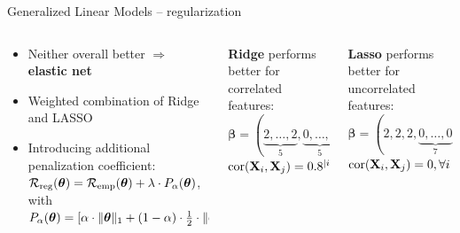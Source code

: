 \documentclass[11pt,compress,t,notes=noshow, xcolor=table]{beamer}
\begin{document}
\begin{frame2}{Generalized Linear Models -- regularization}


\begin{columns}[T, totalwidth=\textwidth]
  \begin{column}{0.62\textwidth}

  \begin{itemize}
    \item Neither overall better $\Rightarrow$ \textbf{elastic net}
    \item Weighted combination of Ridge and LASSO
    \item Introducing additional penalization coefficient: %
    $\mathcal{R}_{\text{reg}}(\bm{\theta}) = \mathcal{R}_{\text{emp}}(\bm{\theta}) 
    + \lambda \cdot P_{\alpha}(\bm{\theta})$, with\\
    $P_{\alpha}(\bm{\theta}) = [\alpha \cdot \|\bm{\theta}\|_1 + (1 - \alpha) \cdot \frac{1}{2} \cdot \|\bm{\theta}\|_2^2]$
  \end{itemize}  


\end{column}

\begin{column}{0.38\textwidth}
\tiny
\centering
\begin{columns}[T, totalwidth=\textwidth]
\begin{column}{0.5\textwidth}
\tiny
\begin{center}
\textbf{Ridge} performs better for correlated features: \\ 
\medskip
$\boldsymbol{\beta}=(\underbrace{2,\ldots,2}_{5},\underbrace{0,\ldots,0}_{5})$\\
$ \operatorname{cor}(\mathbf{X}_{i},\mathbf{X}_{j})=0.8^{|i-j|}, \forall i, j$
  \end{center}
\end{column}
\begin{column}{0.5\textwidth} \tiny

\begin{center}
\textbf{Lasso} performs better for uncorrelated features: \\
\medskip
$\boldsymbol{\beta}=(2, 2, 2,\underbrace{0,\ldots,0}_{7})$ \\
$\operatorname{cor}(\mathbf{X}_{i},\mathbf{X}_{j})= 0, \forall i \neq j$
\end{center}
\end{column}
\end{columns}




\end{column}
\end{columns}
\end{frame2}
\end{document}

